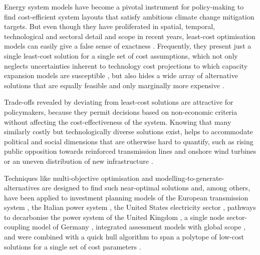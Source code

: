 
Energy system models have become a pivotal instrument for policy-making to find
cost-efficient system layouts that satisfy ambitious climate change mitigation
targets. But even though they have proliferated in spatial, temporal,
technological and sectoral detail and scope in recent years, least-cost
optimisation models can easily give a false sense of exactness
\cite{Trutnevyte2016, pye_modelling_2020}. Frequently, they present just a
single least-cost solution for a single set of cost assumptions, which not only
neglects uncertainties inherent to technology cost projections to which capacity
expansion models are susceptible \cite{trondle_trade-offs_2020, yue_review_2018,
pye_assessing_2018}, but also hides a wide array of alternative solutions that
are equally feasible and only marginally more expensive \cite{nearoptimal,
lombardi_policy_2020, sasse_regional_2020}.


Trade-offs revealed by deviating from least-cost solutions are attractive for
policymakers, because they permit decisions based on non-economic criteria
without affecting the cost-effectiveness of the system. Knowing that many
similarly costly but technologically diverse solutions exist, helps to
accommodate political and social dimensions that are otherwise hard to quantify,
such as rising public opposition towards reinforced transmission lines and
onshore wind turbines or an uneven distribution of new infrastructure
\cite{mccollum_energy_2020,sasse_regional_2020,schlachtberger_cost_2018}.


Techniques like multi-objective optimisation and
modelling-to-generate-alternatives are designed to find such near-optimal
solutions and, among others, have been applied to investment planning models of
the European transmission system \cite{nearoptimal}, the Italian power system
\cite{lombardi_policy_2020}, the United States electricity sector
\cite{DeCarolis2016}, pathways to decarbonise the power system of the United
Kingdom \cite{Li2017}, a single node sector-coupling model of Germany
\cite{nacken_integrated_2019}, integrated assessment models with global scope
\cite{Price2017}, and were combined with a quick hull algorithm to span a
polytope of low-cost solutions for a single set of cost parameters
\cite{pedersen_modeling_2020}.


